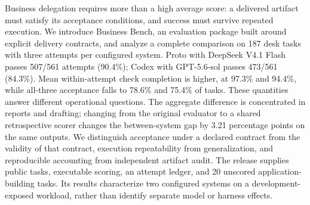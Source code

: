 Business delegation requires more than a high average score: a delivered artifact must satisfy its acceptance conditions, and success must survive repeated execution. We introduce Business Bench, an evaluation package built around explicit delivery contracts, and analyze a complete comparison on 187 desk tasks with three attempts per configured system. Proto with DeepSeek V4.1 Flash passes 507/561 attempts (90.4\%); Codex with GPT-5.6-sol passes 473/561 (84.3\%). Mean within-attempt check completion is higher, at 97.3\% and 94.4\%, while all-three acceptance falls to 78.6\% and 75.4\% of tasks. These quantities answer different operational questions. The aggregate difference is concentrated in reports and drafting; changing from the original evaluator to a shared retrospective scorer changes the between-system gap by 3.21 percentage points on the same outputs. We distinguish acceptance under a declared contract from the validity of that contract, execution repeatability from generalization, and reproducible accounting from independent artifact audit. The release supplies public tasks, executable scoring, an attempt ledger, and 20 unscored application-building tasks. Its results characterize two configured systems on a development-exposed workload, rather than identify separate model or harness effects.
